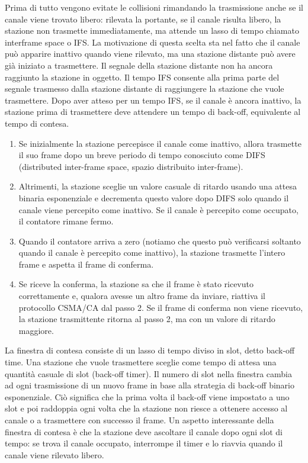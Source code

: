 Prima di tutto vengono evitate le collisioni rimandando la trasmissione anche se il canale viene trovato libero: rilevata la portante, se il canale risulta libero, la stazione non trasmette immediatamente, ma attende un lasso di tempo chiamato interframe space o IFS. La motivazione di questa scelta sta nel fatto che il canale può apparire inattivo quando viene rilevato, ma una stazione distante può avere già iniziato a trasmettere. Il segnale della stazione distante non ha ancora raggiunto la stazione in oggetto. Il tempo IFS consente alla prima parte del segnale trasmesso dalla stazione distante di raggiungere la stazione che vuole trasmettere. Dopo aver atteso per un tempo IFS, se il canale è ancora inattivo, la stazione prima di trasmettere deve attendere un tempo di back-off, equivalente al tempo di contesa.

\begin{enumerate}
    \item Se inizialmente la stazione percepisce il canale come inattivo, allora trasmette il suo frame dopo un breve periodo di tempo conosciuto come DIFS (distributed inter-frame space, spazio distribuito inter-frame).
    \item Altrimenti, la stazione sceglie un valore casuale di ritardo usando una attesa binaria esponenziale e decrementa questo valore dopo DIFS solo quando il canale viene percepito come inattivo. Se il canale è percepito come occupato, il contatore rimane fermo.
    \item Quando il contatore arriva a zero (notiamo che questo può verificarsi soltanto quando il canale è percepito come inattivo), la stazione trasmette l’intero frame e aspetta il frame di conferma.
    \item Se riceve la conferma, la stazione sa che il frame è stato ricevuto correttamente e, qualora avesse un altro frame da inviare, riattiva il protocollo CSMA/CA dal passo 2. Se il frame di conferma non viene ricevuto, la stazione trasmittente ritorna al passo 2, ma con un valore di ritardo maggiore.
\end{enumerate}

La finestra di contesa consiste di un lasso di tempo diviso in slot, detto back-off time. Una stazione che vuole trasmettere sceglie come tempo di attesa una quantità casuale di slot (back-off timer). Il numero di slot nella finestra cambia ad ogni trasmissione di un nuovo frame in base alla strategia di back-off binario esponenziale. Ciò significa che la prima volta il back-off viene impostato a uno slot e poi raddoppia ogni volta che la stazione non riesce a ottenere accesso al canale o a trasmettere con successo il frame. Un aspetto interessante della finestra di contesa è che la stazione deve ascoltare il canale dopo ogni slot di tempo: se trova il canale occupato, interrompe il timer e lo riavvia quando il canale viene rilevato libero.

